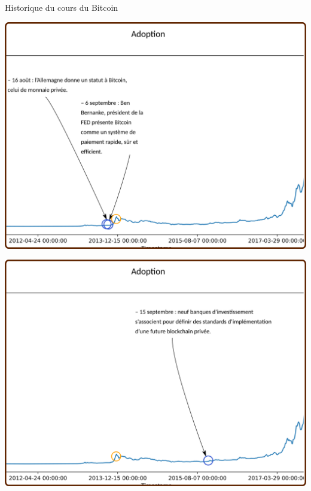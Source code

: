 \documentclass[presentation]{beamer}
\begin{document}
\begin{frame}[label={sec:org6ff9387}]{Historique du cours du Bitcoin}
\begin{block}{}
\begin{center}
\includegraphics[width=.95\textwidth]{./Pictures/Timeline/20adoption.png}
\end{center}
\end{block}

\begin{block}{}
\begin{center}
\includegraphics[width=.95\textwidth]{./Pictures/Timeline/21adoption_blockchain_privee.png}
\end{center}
\end{block}


\end{frame}
\end{document}
